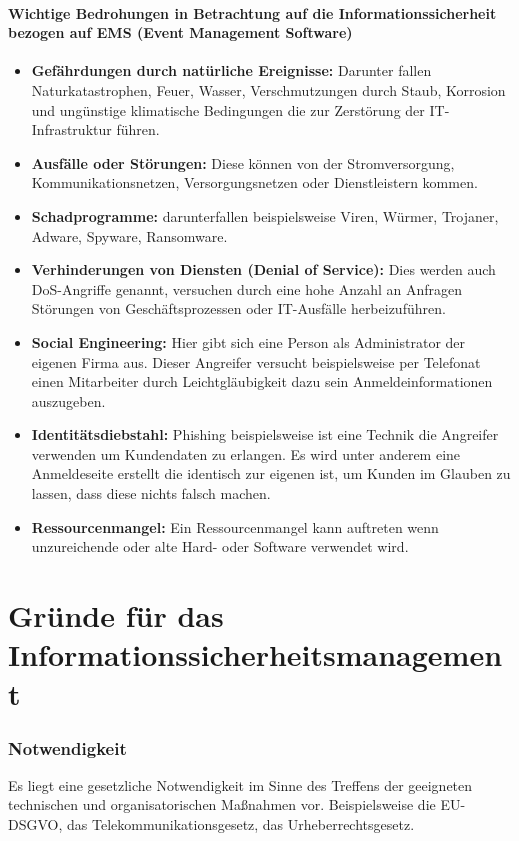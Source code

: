 \paragraph{Wichtige Bedrohungen in Betrachtung auf die Informationssicherheit bezogen auf EMS (Event Management Software)}
\begin{itemize}
	\item \textbf{Gefährdungen durch natürliche Ereignisse:} Darunter fallen Naturkatastrophen, Feuer, Wasser, Verschmutzungen durch Staub, Korrosion und ungünstige klimatische Bedingungen die zur Zerstörung der IT-Infrastruktur führen.
	\item \textbf{Ausfälle oder Störungen:} Diese können von der Stromversorgung, Kommunikationsnetzen, Versorgungsnetzen oder Dienstleistern kommen.
	\item \textbf{Schadprogramme:} darunterfallen beispielsweise Viren, Würmer, Trojaner, Adware, Spyware, Ransomware.
	\item \textbf{Verhinderungen von Diensten (Denial of Service):} Dies werden auch DoS-Angriffe genannt, versuchen durch eine hohe Anzahl an Anfragen Störungen von Geschäftsprozessen oder IT-Ausfälle herbeizuführen.
	\item \textbf{Social Engineering:} Hier gibt sich eine Person als Administrator der eigenen Firma aus. Dieser Angreifer versucht beispielsweise per Telefonat einen Mitarbeiter durch Leichtgläubigkeit dazu sein Anmeldeinformationen auszugeben.
	\item \textbf{Identitätsdiebstahl:} Phishing beispielsweise ist eine Technik die Angreifer verwenden um Kundendaten zu erlangen. Es wird unter anderem eine Anmeldeseite erstellt die identisch zur eigenen ist, um Kunden im Glauben zu lassen, dass diese nichts falsch machen.
	\item \textbf{Ressourcenmangel:} Ein Ressourcenmangel kann auftreten wenn unzureichende oder alte Hard- oder Software verwendet wird. 
\end{itemize}

\section{Gründe für das Informationssicherheitsmanagement}
\subsubsection{Notwendigkeit}
Es liegt eine gesetzliche Notwendigkeit im Sinne des Treffens der geeigneten technischen und organisatorischen Maßnahmen vor. Beispielsweise die EU-DSGVO, das Telekommunikationsgesetz, das Urheberrechtsgesetz.

